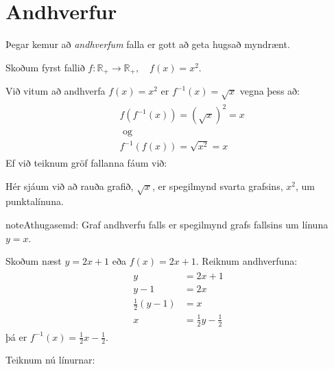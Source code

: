\documentclass[a4paper,10pt,icelandic]{sphinxmanual}
\begin{document}
\section{Andhverfur}
\label{\detokenize{Kafli09:andhverfur}}
Þegar kemur að \textit{andhverfum} falla er gott að geta hugsað myndrænt.

Skoðum fyrst fallið \(f: \mathbb{R}_+ \to \mathbb{R}_+, \quad  f(x)=x^2\).

Við vitum að andhverfa \(f(x)=x^2\) er \(f^{-1}(x)=\sqrt{x}\) vegna þess að:
\begin{equation*}
\begin{split}\begin{aligned}
&f(f^{-1}(x)) = (\sqrt{x})^2=x \\
&\text{ og } \\
&f^{-1}(f(x))=\sqrt{x^2} = x
\end{aligned}\end{split}
\end{equation*}
Ef við teiknum gröf fallanna fáum við:


Hér sjáum við að rauða grafið, \(\sqrt{x}\), er spegilmynd svarta grafsins, \(x^2\), um punktalínuna.

\begin{sphinxadmonition}{note}{Athugasemd:}
Graf andhverfu falls er spegilmynd grafs fallsins um línuna \(y=x\).
\end{sphinxadmonition}

Skoðum næst \(y=2x+1\) eða \(f(x)=2x+1\).
Reiknum andhverfuna:
\begin{equation*}
\begin{split}\begin{aligned}
    y &= 2x+1 \\
    y-1&=2x\\
    \frac{1}{2}\left(y-1\right) &= x\\
    x &= \frac{1}{2} y - \frac{1}{2}
\end{aligned}\end{split}
\end{equation*}
þá er \(f^{-1}(x) = \frac{1}{2} x - \frac{1}{2}\).

Teiknum nú línurnar:

\end{document}
